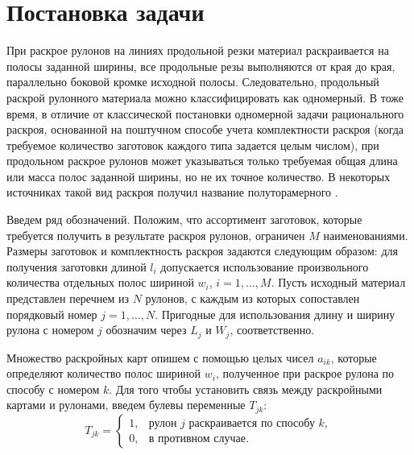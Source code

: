 \documentclass[12pt]{article}
\begin{document}
\section{Постановка задачи}

При раскрое рулонов на линиях продольной резки материал раскраивается на полосы 
заданной ширины, все продольные резы выполняются от края до края, параллельно 
боковой кромке исходной полосы. Следовательно, продольный раскрой рулонного 
материала можно классифицировать как одномерный. В тоже время, в отличие от 
классической постановки одномерной задачи рационального раскроя, основанной на 
поштучном способе учета комплектности раскроя (когда требуемое количество 
заготовок каждого типа задается целым числом), при продольном раскрое рулонов 
может указываться только требуемая общая длина или масса полос заданной ширины, 
но не их точное количество. В некоторых источниках такой вид раскроя получил 
название полуторамерного \cite{bib:song06}.

Введем ряд обозначений. Положим, что ассортимент заготовок, которые требуется 
получить в результате раскроя рулонов, ограничен $M$ наименованиями. Размеры 
заготовок и комплектность раскроя задаются следующим образом: для получения 
заготовки длиной $l_i$ допускается использование произвольного количества 
отдельных полос шириной $w_i$, $i=1,\ldots,M$. Пусть исходный материал 
представлен перечнем из $N$ рулонов, с каждым из которых сопоставлен порядковый 
номер $j=1,\ldots,N$. Пригодные для использования длину и ширину рулона с 
номером $j$ обозначим через $L_j$ и $W_j$, соответственно.

Множество раскройных карт опишем с помощью целых чисел $a_{ik}$, которые 
определяют количество полос шириной $w_i$, полученное при раскрое рулона по 
способу с номером $k$. Для того чтобы установить связь между раскройными 
картами и рулонами, введем булевы переменные $T_{jk}$:
\[ T_{jk}=\begin{cases}
             1, & \text{рулон } j \text{ раскраивается по способу } k, \\
             0, & \text{в противном случае}.
          \end{cases} \]
\end{document}
